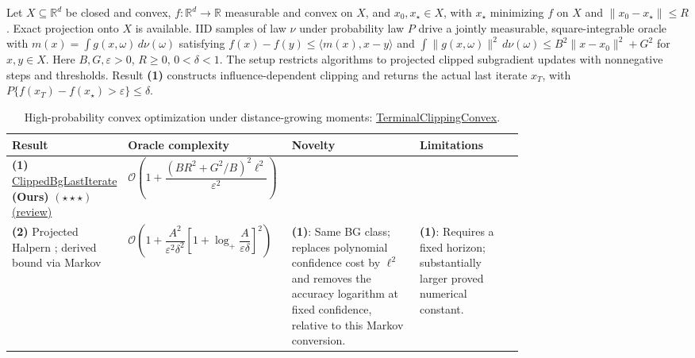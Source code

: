 \begin{table}[tp]
\centering
\caption{High-probability convex optimization under distance-growing moments: \href{https://github.com/k3nfalt/longtails/blob/main/LongTails/Setups/TerminalClippingConvex.lean}{TerminalClippingConvex}.}\label{tab:TerminalClippingConvex}
\parbox{\linewidth}{\footnotesize
Let $X\subseteq\mathbb R^d$ be closed and convex, $f:\mathbb R^d\to\mathbb R$ measurable and convex on $X$, and $x_0,x_\star\in X$, with $x_\star$ minimizing $f$ on $X$ and $\|x_0-x_\star\|\le R$. Exact projection onto $X$ is available. IID samples of law $\nu$ under probability law $P$ drive a jointly measurable, square-integrable oracle with $m(x)=\int g(x,\omega)\,d\nu(\omega)$ satisfying $f(x)-f(y)\le\langle m(x),x-y\rangle$ and $\int\|g(x,\omega)\|^2\,d\nu(\omega)\le B^2\|x-x_0\|^2+G^2$ for $x,y\in X$. Here $B,G,\varepsilon>0$, $R\ge0$, $0<\delta<1$. The setup restricts algorithms to projected clipped subgradient updates with nonnegative steps and thresholds. Result \textbf{(1)} constructs influence-dependent clipping and returns the actual last iterate $x_T$, with $P\{f(x_T)-f(x_\star)>\varepsilon\}\le\delta$.}\par\smallskip
\begin{threeparttable}
\footnotesize
\setlength{\tabcolsep}{4pt}\renewcommand{\arraystretch}{1.18}
\begin{tabularx}{\linewidth}{@{}>{\raggedright\arraybackslash}p{0.18\linewidth}>{\raggedright\arraybackslash}p{0.32\linewidth}>{\raggedright\arraybackslash}p{0.25\linewidth}>{\raggedright\arraybackslash}X@{}}
\toprule
\textbf{Result} & \textbf{Oracle complexity} & \textbf{Novelty} & \textbf{Limitations} \\
\midrule
\textbf{(1)} \href{https://github.com/k3nfalt/longtails/blob/main/LongTails/Theorems/ClippedBgLastIterate.lean}{Clipped\allowbreak Bg\allowbreak Last\allowbreak Iterate} \textbf{(Ours)} $(\star\star\star)$ \href{https://github.com/k3nfalt/longtails/blob/main/scripts/reviews/ClippedBgLastIterate.md}{(review)}
& $\mathcal{O}\!\left(1+\dfrac{(BR^2+G^2/B)^2\ell^2}{\varepsilon^2}\right)$ & & \\
\midrule[1.2pt]
\textbf{(2)} Projected Halpern \citep[Thm.~3.6]{tcAMW2026v3}; derived bound via Markov
& $\mathcal{O}\!\left(1+\dfrac{A^2}{\varepsilon^2\delta^2}\left[1+\log_+\!\dfrac{A}{\varepsilon\delta}\right]^2\right)$
& \textbf{(1)}: Same BG class; replaces polynomial confidence cost by $\ell^2$ and removes the accuracy logarithm at fixed confidence, relative to this Markov conversion.
& \textbf{(1)}: Requires a fixed horizon; substantially larger proved numerical constant. \\

\end{tabularx}
\end{threeparttable}
\end{table}
